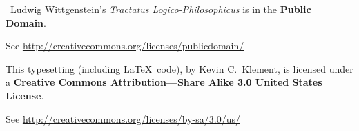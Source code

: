 \documentclass[oneside,openany,12pt]{book}
\begin{document}
\bigskip

\noindent\hrulefill

\phantom{xx}

\noindent {\Huge \copyright}\ Ludwig Wittgenstein's \textit{Tractatus Logico-Philosophicus} is in the \textbf{Public Domain}.

\noindent See \url{http://creativecommons.org/licenses/publicdomain/}


\bigskip

\noindent This typesetting (including \LaTeX\ code), by Kevin C.\ Klement, is licensed under a \textbf{Creative Commons Attribution---Share Alike 3.0 United States License}.

\noindent See \url{http://creativecommons.org/licenses/by-sa/3.0/us/}
\end{document}
